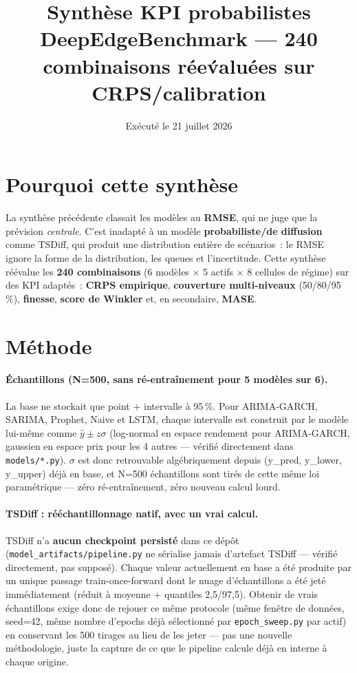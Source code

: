 \documentclass[11pt]{article}
\title{Synth\`ese KPI probabilistes \\ \large DeepEdgeBenchmark --- 240 combinaisons r\'ee\'valu\'ees sur CRPS/calibration}
\author{}
\date{Ex\'ecut\'e le 21 juillet 2026}
\begin{document}
\maketitle

\section{Pourquoi cette synth\`ese}

La synth\`ese pr\'ec\'edente classait les mod\`eles au \textbf{RMSE}, qui ne
juge que la pr\'evision \emph{centrale}. C'est inadapt\'e \`a un mod\`ele
\textbf{probabiliste/de diffusion} comme TSDiff, qui produit une distribution
enti\`ere de sc\'enarios~: le RMSE ignore la forme de la distribution, les
queues et l'incertitude. Cette synth\`ese r\'e\'evalue les \textbf{240
combinaisons} (6 mod\`eles $\times$ 5 actifs $\times$ 8 cellules de r\'egime)
sur des KPI adapt\'es~: \textbf{CRPS empirique}, \textbf{couverture
multi-niveaux} (50/80/95\,\%), \textbf{finesse}, \textbf{score de Winkler} et,
en secondaire, \textbf{MASE}.

\section{M\'ethode}

\paragraph{\'Echantillons (N=500, sans r\'e-entra\^inement pour 5 mod\`eles sur 6).}
La base ne stockait que point + intervalle \`a 95\,\%. Pour ARIMA-GARCH,
SARIMA, Prophet, Naive et LSTM, chaque intervalle est construit par le mod\`ele
lui-m\^eme comme $\hat y \pm z\sigma$ (log-normal en espace rendement pour
ARIMA-GARCH, gaussien en espace prix pour les 4 autres --- v\'erifi\'e
directement dans \texttt{models/*.py}). $\sigma$ est donc retrouvable
alg\'ebriquement depuis (y\_pred, y\_lower, y\_upper) d\'ej\`a en base, et
N=500 \'echantillons sont tir\'es de cette m\^eme loi param\'etrique --- z\'ero
r\'e-entra\^inement, z\'ero nouveau calcul lourd.

\paragraph{TSDiff : r\'e\'echantillonnage natif, avec un vrai calcul.}
TSDiff n'a \textbf{aucun checkpoint persist\'e} dans ce d\'ep\^ot
(\texttt{model\_artifacts/pipeline.py} ne s\'erialise jamais d'artefact
TSDiff --- v\'erifi\'e directement, pas suppos\'e). Chaque valeur
actuellement en base a \'et\'e produite par un unique passage
train-once-forward dont le nuage d'\'echantillons a \'et\'e jet\'e
imm\'ediatement (r\'eduit \`a moyenne + quantiles 2,5/97,5). Obtenir de vrais
\'echantillons exige donc de rejouer ce m\^eme protocole (m\^eme fen\^etre de
donn\'ees, seed=42, m\^eme nombre d'epochs d\'ej\`a s\'electionn\'e par
\texttt{epoch\_sweep.py} par actif) en conservant les 500 tirages au lieu de
les jeter --- pas une nouvelle m\'ethodologie, juste la capture de ce que le
pipeline calcule d\'ej\`a en interne \`a chaque origine.
\end{document}
